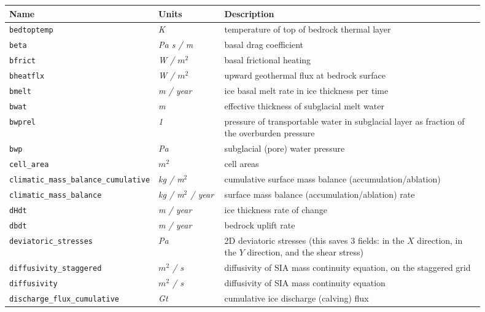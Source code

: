 \begin{table}[ht]
  \centering
  \begin{tabular}{p{0.15\linewidth}p{0.15\linewidth}p{0.6\linewidth}}
    \toprule
    \textbf{Name} & \textbf{Units} & \textbf{Description} \\
    \midrule
    \texttt{bedtoptemp} & \textsl{K} & temperature of top of bedrock thermal layer \\
    \texttt{beta} & \textsl{Pa s / m} & basal drag coefficient\\
    \texttt{bfrict} & \textsl{W  / $m^2$} &  basal frictional heating \\
    \texttt{bheatflx} & \textsl{W  / $m^2$} & upward geothermal flux at bedrock surface \\
    \texttt{bmelt} & \textsl{m / year} & ice basal melt rate in ice thickness per time \\
    \texttt{bwat} & \textsl{m} & effective thickness of subglacial melt water \\
    \texttt{bwprel} & \textsl{1} & pressure of transportable water in subglacial layer as fraction of the overburden pressure\\
    \texttt{bwp} & \textsl{Pa} & subglacial (pore) water pressure \\
    \texttt{cell_area} & \textsl{$m^{2}$} & cell areas \\
    \texttt{climatic_mass_balance_cumulative} & \textsl{kg / m$^2$} & cumulative surface mass balance (accumulation/ablation) \\
    \texttt{climatic_mass_balance} & \textsl{kg / m$^2$ / year} & surface mass balance (accumulation/ablation) rate \\
    \texttt{dHdt} & \textsl{m / year} &  ice thickness rate of change \\
    \texttt{dbdt} & \textsl{m / year} & bedrock uplift rate \\
    \texttt{deviatoric_stresses} & \textsl{Pa} & 2D deviatoric stresses (this saves 3 fields: in the $X$ direction, in the $Y$ direction, and the shear stress) \\
    \texttt{diffusivity_staggered} & \textsl{$m^{2}$  / s} &  diffusivity of SIA mass continuity equation, on the staggered grid \\
    \texttt{diffusivity} & \textsl{$m^{2}$  / s} &  diffusivity of SIA mass continuity equation \\
    \texttt{discharge_flux_cumulative} & \textsl{Gt} & cumulative ice discharge (calving) flux \\

\end{tabular}
\end{table}
